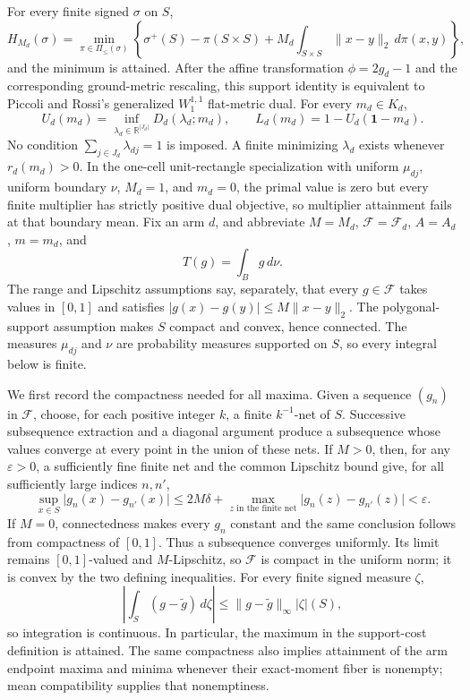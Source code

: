 For every finite signed \(\sigma\) on \(S\), \[H_{M_d}(\sigma)=\min_{\pi\in\Pi_{\le}(\sigma)}\left\{\sigma^+(S)-\pi(S\times S)+M_d\int_{S\times S}\|x-y\|_2\,d\pi(x,y)\right\},\] and the minimum is attained. After the affine transformation \(\phi=2g_d-1\) and the corresponding ground-metric rescaling, this support identity is equivalent to Piccoli and Rossi's generalized \(W_1^{1,1}\) flat-metric dual. For every \(m_d\in K_d\), \[U_d(m_d)=\inf_{\lambda_d\in\mathbb R^{|J_d|}}D_d(\lambda_d;m_d),\qquad L_d(m_d)=1-U_d(\mathbf 1-m_d).\] No condition \(\sum_{j\in J_d}\lambda_{dj}=1\) is imposed. A finite minimizing \(\lambda_d\) exists whenever \(r_d(m_d)>0\). In the one-cell unit-rectangle specialization with uniform \(\mu_{dj}\), uniform boundary \(\nu\), \(M_d=1\), and \(m_d=0\), the primal value is zero but every finite multiplier has strictly positive dual objective, so multiplier attainment fails at that boundary mean.
Fix an arm \(d\), and abbreviate \(M=M_d\), \(\mathcal F=\mathcal F_d\), \(A=A_d\), \(m=m_d\), and
\[
 T(g)=\int_B g\,d\nu.
\]
The range and Lipschitz assumptions say, separately, that every \(g\in\mathcal F\) takes values in \([0,1]\) and satisfies \(\lvert g(x)-g(y)\rvert\leq M\lVert x-y\rVert_2\).  The polygonal-support assumption makes \(S\) compact and convex, hence connected.  The measures \(\mu_{dj}\) and \(\nu\) are probability measures supported on \(S\), so every integral below is finite.

We first record the compactness needed for all maxima.  Given a sequence \((g_n)\) in \(\mathcal F\), choose, for each positive integer \(k\), a finite \(k^{-1}\)-net of \(S\).  Successive subsequence extraction and a diagonal argument produce a subsequence whose values converge at every point in the union of these nets.  If \(M>0\), then, for any \(\varepsilon>0\), a sufficiently fine finite net and the common Lipschitz bound give, for all sufficiently large indices \(n,n'\),
\[
 \sup_{x\in S}\lvert g_n(x)-g_{n'}(x)\rvert
 \leq 2M\delta+\max_{z\text{ in the finite net}}
       \lvert g_n(z)-g_{n'}(z)\rvert
 <\varepsilon.
\]
If \(M=0\), connectedness makes every \(g_n\) constant and the same conclusion follows from compactness of \([0,1]\).  Thus a subsequence converges uniformly.  Its limit remains \([0,1]\)-valued and \(M\)-Lipschitz, so \(\mathcal F\) is compact in the uniform norm; it is convex by the two defining inequalities.  For every finite signed measure \(\zeta\),
\[
 \left\lvert\int_S(g-\widetilde g)\,d\zeta\right\rvert
 \leq \lVert g-\widetilde g\rVert_\infty\lvert\zeta\rvert(S),
\]
so integration is continuous.  In particular, the maximum in the support-cost definition is attained.  The same compactness also implies attainment of the arm endpoint maxima and minima whenever their exact-moment fiber is nonempty; mean compatibility supplies that nonemptiness.

